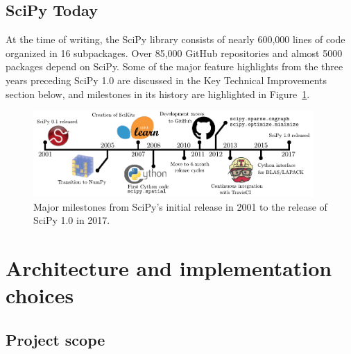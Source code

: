 \documentclass[fleqn,10pt]{wlscirep}
\begin{document}
\subsection*{SciPy Today}
At the time of writing, the SciPy library consists of nearly 
600,000 lines of code organized in 16 subpackages. 
Over 85,000 GitHub repositories and almost 5000 packages depend
on SciPy. Some of the major
feature highlights from the three years preceding
SciPy 1.0 are discussed in the Key Technical Improvements section below,
and milestones in its history are highlighted in Figure~\ref{fig:timeline}.

\begin{figure}[H]
\centering
\includegraphics[width=0.95\textwidth]{static/scipy_timeline}
\caption{Major milestones from SciPy's initial release in 2001 to
the release of SciPy 1.0 in 2017.}
\label{fig:timeline}
\end{figure}




\section*{Architecture and implementation choices}
\subsection*{Project scope}
\end{document}
